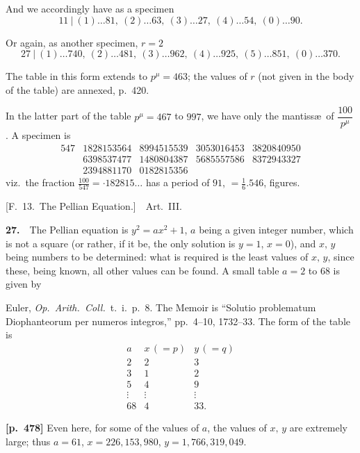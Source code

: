 \documentclass[11pt,a4paper]{article}
\begin{document}
And we accordingly have as a specimen
\[
11\ |\ (1)\ldots 81,\ (2)\ldots 63,\ (3)\ldots 27,\ (4)\ldots 54,\ (0)\ldots 90.
\]

Or again, as another specimen, $r=2$
\[
27\ |\ (1)\ldots 740,\ (2)\ldots 481,\ (3)\ldots 962,\ (4)\ldots 925,\ (5)\ldots 851,\ (0)\ldots 370.
\]

The table in this form extends to $p^\mu=463$; the values of $r$ (not given in the body of the table) are annexed, p.~420.

In the latter part of the table $p^\mu=467$ to $997$, we have only the mantiss\ae\ of $\dfrac{100}{p^\mu}$.   A specimen is
\[
\begin{array}{c|cccc}
547 & 1828153564 & 8994515539 & 3053016453 & 3820840950 \\
    & 6398537477 & 1480804387 & 5685557586 & 8372943327 \\
    & 2394881170 & 0182815356 & &
\end{array}
\]
viz.\ the fraction $\tfrac{100}{547}=\cdot 182815\ldots$ has a period of $91$, $=\tfrac{1}{6}.546$, figures.

\bigskip
\begin{center}
[F.~13.\ The Pellian Equation.]\ \ Art.~III.
\end{center}

\textbf{27.}\ \ The Pellian equation is $y^2=ax^2+1$, $a$ being a given integer number, which is not a square (or rather, if it be, the only solution is $y=1$, $x=0$), and $x,\,y$ being numbers to be determined: what is required is the least values of $x,\,y$, since these, being known, all other values can be found.   A small table $a=2$ to $68$ is given by

Euler, \textit{Op.\ Arith.\ Coll.}\ t.~i.\ p.~8.   The Memoir is ``Solutio problematum Diophanteorum per numeros integros,'' pp.~4--10, 1732--33.   The form of the table is
\[
\begin{array}{c|cc}
a & x\,(=p) & y\,(=q) \\\hline
2 & 2 & 3 \\
3 & 1 & 2 \\
5 & 4 & 9 \\
\vdots & \vdots & \vdots \\
68 & 4 & 33.
\end{array}
\]

\bigskip
\noindent\textbf{[p.~478]}\quad
Even here, for some of the values of $a$, the values of $x,\,y$ are extremely large; thus $a=61$, $x=226{,}153{,}980$, $y=1{,}766{,}319{,}049$.
\end{document}
